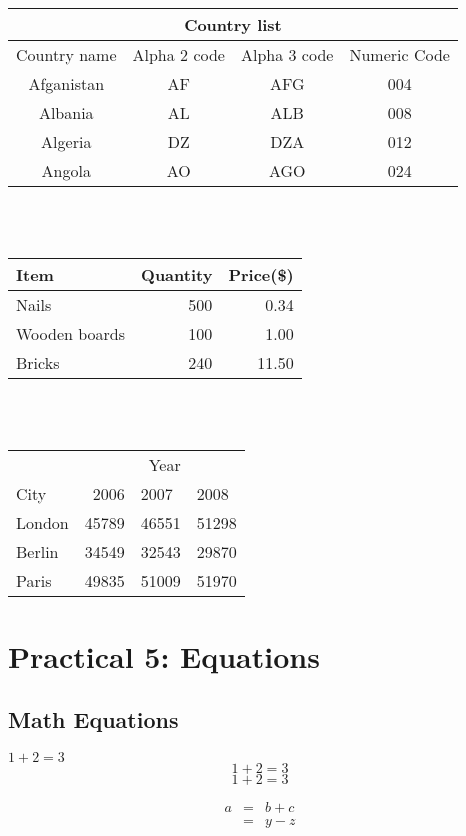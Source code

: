 \documentclass[a4paper,12pt]{report}
\begin{document}
\begin{tabular}{|c|c|c|c|}
\hline
\multicolumn{4}{|c|}{Country list} \\
\hline
Country name & Alpha 2 code& Alpha 3 code& Numeric Code\\
\hline
Afganistan & AF & AFG & 004\\
Albania & AL & ALB & 008\\
Algeria & DZ & DZA &012\\
Angola & AO & AGO & 024\\
\hline
\end{tabular}
\\
\\

\begin{tabular}{l|r|r}


Item &Quantity &Price(\$)  \\
\hline
Nails & 500 & 0.34 \\
Wooden boards & 100 & 1.00 \\
Bricks & 240 & 11.50\\
\end{tabular}
\\
\\

\begin{tabular}{l|rll}
\multicolumn{3}{r}{Year} \\
\cline{2-4}
City & 2006 & 2007 &2008\\
\hline
London & 45789 & 46551 & 51298\\
Berlin &34549 & 32543 & 29870\\
Paris & 49835 & 51009 & 51970\\
\end{tabular}



\chapter*{Practical 5: Equations}
\section{Math Equations}

$1+2=3$
$$1+2=3$$
\begin{equation}
1+2=3
\end{equation}

\begin{eqnarray*}
a & = & b + c \\
&=&y-z
\end{eqnarray*}
\end{document}

